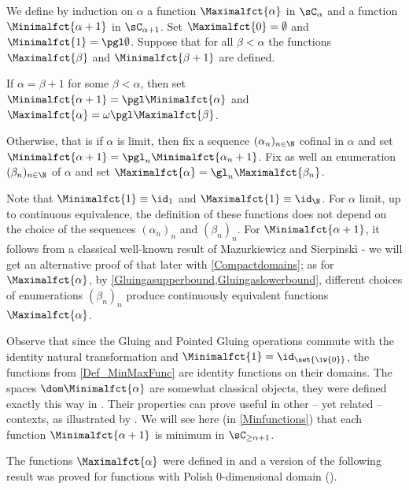 \begin{definition}\label{Def_MinMaxFunc}
We define by induction on $\alpha$ a function $\Maximalfct{\alpha}$ in $\sC_\alpha$ and a function $\Minimalfct{\alpha+1}$ in $\sC_{\alpha+1}$.
Set $\Maximalfct{0}=\emptyset$ and $\Minimalfct{1}=\pgl\emptyset$.
Suppose that for all $\beta<\alpha$ the functions $\Maximalfct{\beta}$ and $\Minimalfct{\beta+1}$ are defined.

If $\alpha=\beta+1$ for some $\beta<\alpha$, then set $\Minimalfct{\alpha+1}=\pgl \Minimalfct{\alpha}$ and $\Maximalfct{\alpha}=\omega\pgl \Maximalfct{\beta}$.

Otherwise, that is if $\alpha$ is limit, then fix a sequence $(\alpha_n)_{n\in\N}$ cofinal in $\alpha$ and set $\Minimalfct{\alpha+1}=\pgl_n\Minimalfct{\alpha_n+1}$.
Fix as well an enumeration $(\beta_n)_{n\in\N}$ of $\alpha$ and set $\Maximalfct{\alpha}=\gl_n\Maximalfct{\beta_n}$.
\end{definition}

Note that $\Minimalfct{1}\equiv\id_{1}$ and $\Maximalfct{1}\equiv \id_{\N}$. For $\alpha$ limit, up to continuous equivalence, the definition of these functions does not depend on the choice of the sequences $(\alpha_n)_n$ and $(\beta_n)_n$.
For $\Minimalfct{\alpha+1}$, it follows from a classical well-known result of Mazurkiewicz and Sierpinskì \cite[Théorème 1]{SierpMazCompDen}
- we will get an alternative proof of that later with \cref{Compactdomains};
as for $\Maximalfct{\alpha}$, by \cref{Gluingasupperbound,Gluingaslowerbound},
different choices of enumerations $(\beta_n)_n$ produce continuously equivalent functions $\Maximalfct{\alpha}$.

Observe that since the Gluing and Pointed Gluing operations commute with the identity natural transformation and $\Minimalfct{1}=\id_{\set{\iw{0}}}$, the functions from \cref{Def_MinMaxFunc} are identity functions on their domains.
The spaces $\dom \Minimalfct{\alpha}$ are somewhat classical objects, they were defined exactly this way in \cite{carroy2013quasi}.
Their properties can prove useful in other -- yet related -- contexts, as illustrated by \cite[Proposition 3.12]{CMRSWadge}.
We will see here (in \cref{Minfunctions}) that each function $\Minimalfct{\alpha+1}$ is minimum in $\sC_{\geq \alpha+1}$.


The functions $\Maximalfct{\alpha}$ were defined in \cite[Definition 5.34]{phdcarroy}
and a version of the following result was proved for functions with Polish $0$-dimensional domain (\cite[Proposition 5.36 and Corollary 6.6]{phdcarroy}).


